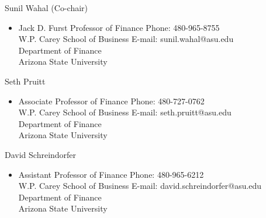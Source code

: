 \documentclass[11pt]{article}
\newenvironment{innerlist}[1][\enskip\textbullet]%
        {\begin{itemize}[#1,leftmargin=*,parsep=0pt,itemsep=0pt,topsep=0pt,partopsep=0pt]}
        {\end{itemize}}
\newcommand{\halfblankline}{\quad\vspace{-0.5\baselineskip}\pagebreak[3]}
\begin{document}
\halfblankline

Sunil Wahal (Co-chair)
\begin{innerlist}
\item[] Jack D. Furst Professor of Finance \hfill {Phone: 480-965-8755}\\
W.P. Carey School of Business \hfill{E-mail: sunil.wahal@asu.edu}\\
Department of Finance\\
Arizona State University
\end{innerlist}


\halfblankline

Seth Pruitt
\begin{innerlist}
\item[] Associate Professor of Finance \hfill {Phone: 480-727-0762}\\
W.P. Carey School of Business \hfill{E-mail: seth.pruitt@asu.edu}\\
Department of Finance\\
Arizona State University
\end{innerlist}

\halfblankline

David Schreindorfer
\begin{innerlist}
\item[] Assistant Professor of Finance \hfill {Phone: 480-965-6212}\\
W.P. Carey School of Business \hfill{E-mail: david.schreindorfer@asu.edu}\\
Department of Finance\\
Arizona State University
\end{innerlist}
\end{document}
